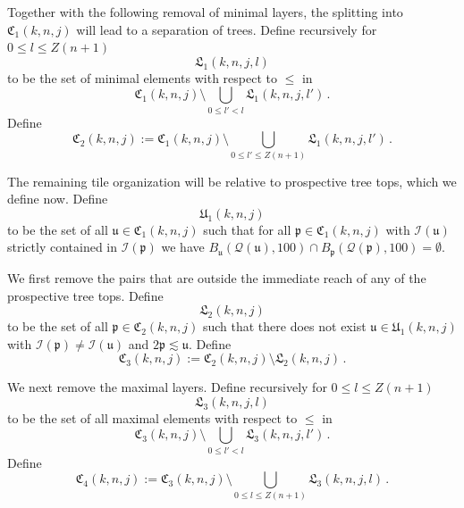\documentclass[10pt,a4paper]{article}
\theoremstyle{plain}
\theoremstyle{definition}
\numberwithin{equation}{subsection}
\newcommand{\fp}{{\mathfrak p}}
\newcommand{\fu}{{\mathfrak u}}
\newcommand{\fU}{{\mathfrak U}}
\newcommand{\fL}{{\mathfrak L}}
\newcommand{\fC}{{\mathfrak C}}
\newcommand{\scI}{{\mathcal{I}}} %
\newcommand{\fcc}{{\mathcal{Q}}}
\begin{document}
Together with the following removal of minimal layers, the splitting into $\fC_1(k,n,j)$ will lead to a separation of trees.
Define recursively for $0\le l\le Z(n+1)$
\begin{equation}
    \label{eq-L1-def}
    \fL_1(k,n,j,l)
\end{equation}
to be the set of minimal elements with respect to $\le$ in
\begin{equation}
    \fC_1(k,n,j)\setminus \bigcup_{0\le l'<l}
\fL_1(k,n,j,l')\, .
\end{equation}
Define
\begin{equation}
    \label{eq-C2-def}
    \fC_2(k,n,j):= \fC_1(k,n,j)\setminus \bigcup_{0\le l'\le Z(n+1)}
\fL_1(k,n,j,l')\, .
\end{equation}

The remaining tile organization will be relative to
prospective tree tops, which we define now.
Define
\begin{equation}\label{defunkj}
     \fU_1(k,n,j)
\end{equation}
to be the set of all
$\fu \in \fC_1(k,n,j)$ such that
for all $\fp \in \fC_1(k,n,j)$
with $\scI(\fu)$ strictly contained in
$\scI(\fp)$ we have $B_{\fu}(\fcc(\fu), 100) \cap B_{\fp}(\fcc(\fp),100) = \emptyset$.

We first remove the pairs that are outside the immediate reach of any of the prospective tree tops.
Define
\begin{equation}
\label{eq-L2-def}
\fL_2(k,n,j)
\end{equation}
to be the set of all $\fp\in \fC_2(k,n,j)$ such that there
does not exist
$\fu\in \fU_1(k,n,j)$
with $\scI(\fp)\neq \scI(\fu)$ and $2\fp\lesssim \fu$.
Define
\begin{equation}
\label{eq-C3-def}
\fC_3(k,n,j):=\fC_2(k,n,j)
  \setminus \fL_2(k,n,j)\, .
\end{equation}


We next remove the maximal layers.
Define recursively for $0 \le l \le Z(n+1)$
\begin{equation}
    \label{eq-L3-def}
    \fL_3(k,n,j,l)
\end{equation}
to be the set of all maximal elements with respect to $\le$ in
\begin{equation}
    \fC_3(k,n,j) \setminus \bigcup_{0 \le l' < l} \fL_3(k,n,j,l')\,.
\end{equation}
Define
\begin{equation}
\label{eq-C4-def}
\fC_4(k,n,j):=\fC_3(k,n,j)
  \setminus \bigcup_{0 \le l \le Z(n+1)} \fL_3(k,n,j,l)\,.
\end{equation}
\end{document}
